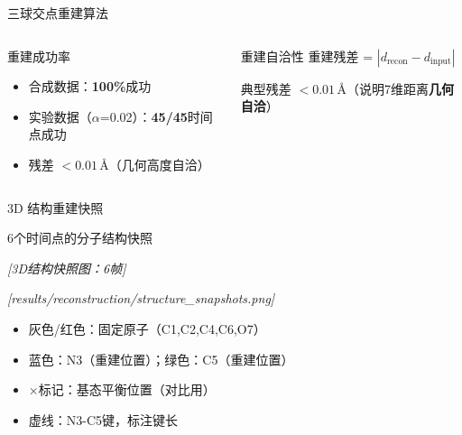 \documentclass[aspectratio=169,9pt]{beamer}
\begin{document}
\begin{frame}{三球交点重建算法}
\begin{columns}[T]
    \begin{exampleblock}{重建成功率}
      \scriptsize
      \begin{itemize}
        \item 合成数据：\textbf{100\%}成功
        \item 实验数据（$\alpha$=0.02）：\textbf{45/45}时间点成功
        \item 残差 $< 0.01$\,\AA（几何高度自洽）
      \end{itemize}
    \end{exampleblock}

    \begin{block}{重建自洽性}
      \scriptsize
      重建残差 = $|d_{\text{recon}} - d_{\text{input}}|$

      典型残差 $< 0.01$\,\AA（说明7维距离\textbf{几何自洽}）
    \end{block}
  \end{columns}
\end{frame}

\begin{frame}{3D 结构重建快照}
  \begin{block}{6个时间点的分子结构快照}
    \scriptsize
    \begin{center}
      \textit{[3D结构快照图：6帧]}

      \textit{[results/reconstruction/structure\_snapshots.png]}
    \end{center}
    \begin{itemize}
      \item 灰色/红色：固定原子（C1,C2,C4,C6,O7）
      \item 蓝色：N3（重建位置）；绿色：C5（重建位置）
      \item $\times$标记：基态平衡位置（对比用）
      \item 虚线：N3-C5键，标注键长
    \end{itemize}
  \end{block}
\end{frame}
\end{document}
